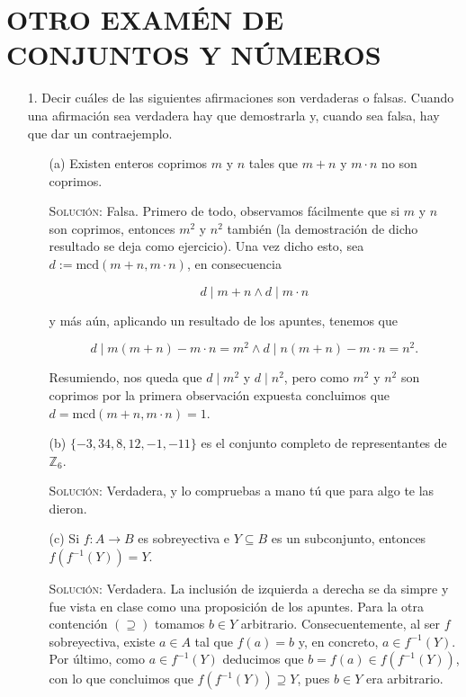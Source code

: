 \documentclass{article}
\begin{document}
\newpage

\section{OTRO EXAMÉN DE CONJUNTOS Y NÚMEROS}

\begin{enumerate}
    \item[1.] Decir cuáles de las siguientes afirmaciones son verdaderas o falsas. Cuando una afirmación sea verdadera hay que demostrarla y, cuando sea falsa, hay que dar un contraejemplo.

    \begin{enumerate}
        \item[(a)] Existen enteros coprimos $m$ y $n$ tales que $m + n$ y $m \cdot n$ no son coprimos.

        \textsc{Solución}: Falsa. Primero de todo, observamos fácilmente que si $m$ y $n$ son coprimos, entonces $m^2$ y $n^2$ también (la demostración de dicho resultado se deja como ejercicio). Una vez dicho esto, sea $d := \text{mcd}(m + n, m \cdot n)$, en consecuencia

        \[d \mid m + n \land d \mid m \cdot n\]

        y más aún, aplicando un resultado de los apuntes, tenemos que

        \[d \mid m(m + n) - m \cdot n = m^2 \land d \mid n(m + n) - m \cdot n = n^2.\]

        Resumiendo, nos queda que $d \mid m^2$ y $d \mid n^2$, pero como $m^2$ y $n^2$ son coprimos por la primera observación expuesta concluimos que $d = \text{mcd}(m + n, m \cdot n) = 1$.

        \item[(b)] $\{-3, 34, 8, 12, -1, -11\}$ es el conjunto completo de representantes de $\mathbb{Z}_6$.

        \textsc{Solución}: Verdadera, y lo compruebas a mano tú que para algo te las dieron.

        \item[(c)] Si $f : A \longrightarrow B$ es sobreyectiva e $Y \subseteq B$ es un subconjunto, entonces $f(f^{-1}(Y)) = Y$.

        \textsc{Solución}: Verdadera. La inclusión de izquierda a derecha se da simpre y fue vista en clase como una proposición de los apuntes. Para la otra contención $(\supseteq)$ tomamos $b \in Y$ arbitrario. Consecuentemente, al ser $f$ sobreyectiva, existe $a \in A$ tal que $f(a) = b$ y, en concreto, $a \in f^{-1}(Y)$. Por último, como $a \in f^{-1}(Y)$ deducimos que $b = f(a) \in f(f^{-1}(Y))$, con lo que concluimos que $f(f^{-1}(Y)) \supseteq Y$, pues $b \in Y$ era arbitrario.


\end{enumerate}
\end{enumerate}
\end{document}
